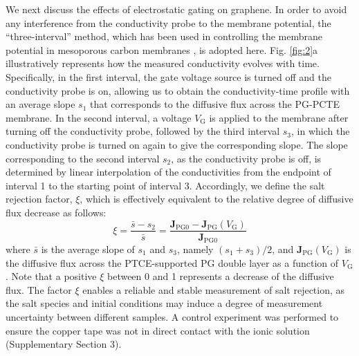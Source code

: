 \documentclass[journal=langd5,email=true, hyperref=true, keywords=false]{achemso}
\newcommand{\Fig}{Fig.}
\begin{document}
We next discuss the effects of electrostatic gating on graphene. In
order to avoid any interference from the conductivity probe to the
membrane potential, the “three-interval” method, which has been used
in controlling the membrane potential in mesoporous carbon membranes
\cite{Surwade_2014}, is adopted here. \Fig{} \ref{fig:2}a
illustratively represents how the measured conductivity evolves with
time. Specifically, in the first interval, the gate voltage source is
turned off and the conductivity probe is on, allowing us to obtain the
conductivity-time profile with an average slope $s_{1}$ that
corresponds to the diffusive flux across the PG-PCTE membrane. In
the second interval, a voltage $V_{\mathrm{G}}$ is applied to the
membrane after turning off the conductivity probe, followed by the
third interval $s_{3}$, in which the conductivity probe is turned on
again to give the corresponding slope. The slope corresponding to the
second interval $s_{2}$, as the conductivity probe is off, is
determined by linear interpolation of the conductivities from the
endpoint of interval 1 to the starting point of interval
3. Accordingly, we define the salt rejection factor, $\xi$, which is
effectively equivalent to the relative degree of diffusive flux
decrease as follows:
\begin{equation}
  \label{eq:rejection}
  \xi = \frac{\bar{s} - s_{2}}{\bar{s}} = \frac{\boldsymbol{J}_{\mathrm{PG0}}
    - \boldsymbol{J}_{\mathrm{PG}}(V_{\mathrm{G}})}{\boldsymbol{J}_{\mathrm{PG0}}}
\end{equation}
where $\bar{s}$ is the average slope of $s_{1}$ and $s_{3}$, namely
$(s_{1} + s_{3})/2$, and
$\boldsymbol{J}_{\mathrm{PG}}(V_{\mathrm{G}})$ is the diffusive flux
across the PTCE-supported PG double layer as a function of
$V_{\mathrm{G}}$. Note that a positive $\xi$ between 0 and 1
represents a decrease of the diffusive flux. The factor $\xi$ enables
a reliable and stable measurement of salt rejection, as the salt
species and initial conditions may induce a degree of measurement
uncertainty between different samples. A control experiment was
performed to ensure the copper tape was not in direct contact with the
ionic solution (Supplementary Section 3).
\end{document}
